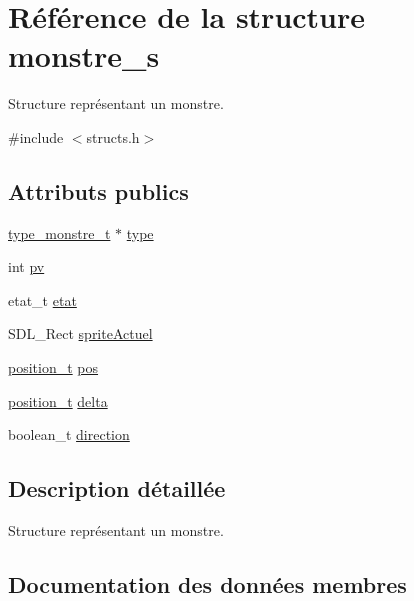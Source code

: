 \hypertarget{structmonstre__s}{}\section{Référence de la structure monstre\+\_\+s}
\label{structmonstre__s}


Structure représentant un monstre.  




{\ttfamily \#include $<$structs.\+h$>$}

\subsection*{Attributs publics}
\begin{DoxyCompactItemize}
\item 
\hyperlink{structtype__monstre__s}{type\+\_\+monstre\+\_\+t} $\ast$ \hyperlink{structmonstre__s_af58fb0da12d89fbdce602578f457560e}{type}
\item 
int \hyperlink{structmonstre__s_a1e26c0e85b90352f9496f331ec74e98d}{pv}
\item 
etat\+\_\+t \hyperlink{structmonstre__s_a38d270db8b7dd326f1e014eb3b72b740}{etat}
\item 
S\+D\+L\+\_\+\+Rect \hyperlink{structmonstre__s_a7c57e6c890e0709f09b1df09c71a8daa}{sprite\+Actuel}
\item 
\hyperlink{structposition__s}{position\+\_\+t} \hyperlink{structmonstre__s_a972c2fb3087127d04bd3719d62c1030e}{pos}
\item 
\hyperlink{structposition__s}{position\+\_\+t} \hyperlink{structmonstre__s_a9a4bad53b10cc5379c594dd689750b0c}{delta}
\item 
boolean\+\_\+t \hyperlink{structmonstre__s_aa1a2d6868b660addc5855614f1849540}{direction}
\end{DoxyCompactItemize}


\subsection{Description détaillée}
Structure représentant un monstre. 

\subsection{Documentation des données membres}
\mbox{\label{structmonstre__s_a9a4bad53b10cc5379c594dd689750b0c}} 
